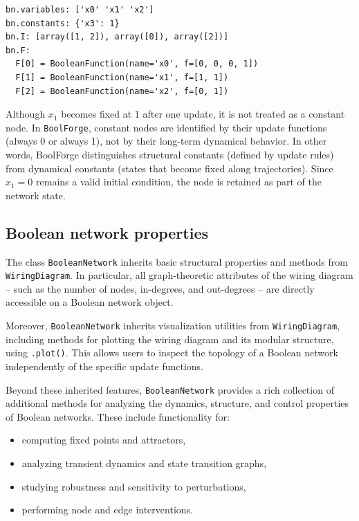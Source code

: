 \documentclass[
]{article}
\providecommand{\tightlist}{%
  \setlength{\itemsep}{0pt}\setlength{\parskip}{0pt}}
\begin{document}
\begin{lstlisting}
bn.variables: ['x0' 'x1' 'x2']
bn.constants: {'x3': 1}
bn.I: [array([1, 2]), array([0]), array([2])]
bn.F:
  F[0] = BooleanFunction(name='x0', f=[0, 0, 0, 1])
  F[1] = BooleanFunction(name='x1', f=[1, 1])
  F[2] = BooleanFunction(name='x2', f=[0, 1])
\end{lstlisting}

Although \(x_1\) becomes fixed at 1 after one update, it is not treated
as a constant node. In \texttt{BoolForge}, constant nodes are identified
by their update functions (always 0 or always 1), not by their long-term
dynamical behavior. In other words, BoolForge distinguishes structural
constants (defined by update rules) from dynamical constants (states
that become fixed along trajectories). Since \(x_1 = 0\) remains a valid
initial condition, the node is retained as part of the network state.

\subsection{Boolean network
properties}\label{boolean-network-properties}

The class \texttt{BooleanNetwork} inherits basic structural properties
and methods from \texttt{WiringDiagram}. In particular, all
graph-theoretic attributes of the wiring diagram -- such as the number
of nodes, in-degrees, and out-degrees -- are directly accessible on a
Boolean network object.

Moreover, \texttt{BooleanNetwork} inherits visualization utilities from
\texttt{WiringDiagram}, including methods for plotting the wiring
diagram and its modular structure, using \texttt{.plot()}. This allows
users to inspect the topology of a Boolean network independently of the
specific update functions.

Beyond these inherited features, \texttt{BooleanNetwork} provides a rich
collection of additional methods for analyzing the dynamics, structure,
and control properties of Boolean networks. These include functionality
for:

\begin{itemize}
\tightlist
\item
  computing fixed points and attractors,
\item
  analyzing transient dynamics and state transition graphs,
\item
  studying robustness and sensitivity to perturbations,
\item
  performing node and edge interventions.
\end{itemize}
\end{document}
